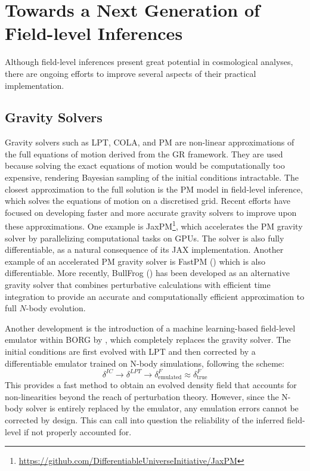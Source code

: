 \section{Towards a Next Generation of Field-level Inferences}
Although field-level inferences present great potential in cosmological analyses, there are ongoing efforts to improve several aspects of their practical 
implementation. 

\subsection{Gravity Solvers}

Gravity solvers such as LPT, COLA, and PM are non-linear approximations of the full equations of motion derived from the GR 
framework. They are used because solving the exact equations of motion would be computationally too expensive, rendering Bayesian sampling of the 
initial conditions intractable. The closest approximation to the full solution is the PM model in field-level inference, which solves the equations of motion on a 
discretised grid. Recent efforts have focused on developing faster and more accurate gravity solvers to improve upon these approximations. One 
example is JaxPM\footnote{\url{https://github.com/DifferentiableUniverseInitiative/JaxPM}}, which accelerates the PM gravity solver by parallelizing computational 
tasks on GPUs. The solver is also fully differentiable, as a natural consequence of its JAX implementation. Another example of an accelerated PM gravity solver is 
FastPM (\cite{Feng_2016}) which is also differentiable. 
More recently, BullFrog (\cite{Rampf_2025}) has been developed as an 
alternative gravity solver that combines perturbative calculations with 
efficient time integration to provide an accurate and computationally 
efficient approximation to full $N$-body evolution. 


Another development is the introduction of a machine learning-based field-level emulator within BORG by \cite{Doeser_2024}, which completely 
replaces the gravity solver. The initial conditions are first evolved with LPT and then corrected by a differentiable emulator trained on 
N-body simulations, following the scheme:
\begin{equation}
    \delta^{IC} \longrightarrow \delta^{LPT} \longrightarrow 
    \delta^F_{\text{emulated}} \approx \delta^F_{\text{true}}
\end{equation}
This provides a fast method to obtain an evolved density field that accounts for non-linearities beyond the reach of perturbation theory. 
However, since the N-body solver is entirely replaced by the emulator, any emulation errors cannot be corrected by design. 
This can call into question the reliability of the inferred field-level if not properly accounted for. 

